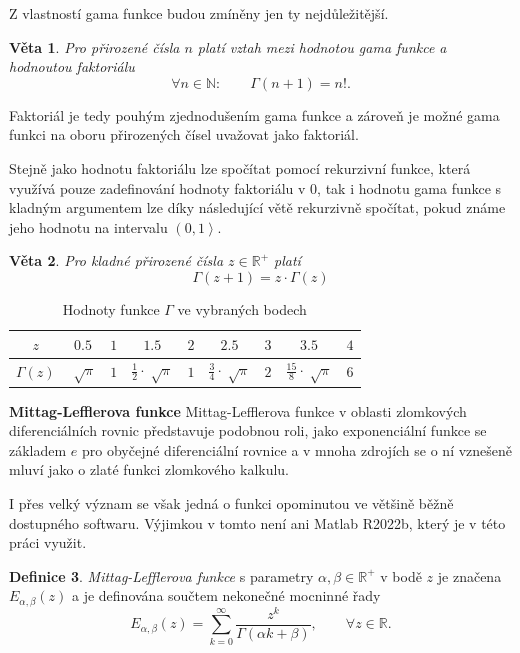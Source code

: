 \documentclass[a4paper,12pt,twoside]{article}
\newtheorem{veta}{Věta}[section]
\theoremstyle{definition}
\newtheorem{defin}[veta]{Definice}
\theoremstyle{remark}
\numberwithin{equation}{section}
\numberwithin{table}{section}
\numberwithin{figure}{section}
\newcommand{\R}{\mathbb{R}}
\newcommand{\N}{\mathbb{N}}
\begin{document}
Z vlastností gama funkce budou zmíněny jen ty nejdůležitější.
\begin{veta} Pro přirozené čísla $n$ platí vztah mezi hodnotou gama funkce a hodnoutou faktoriálu
	\begin{equation}
		\forall n \in \N:	\qquad  \Gamma\left( n+1\right)  = n!.
	\end{equation}
\end{veta} \label{gamma}
Faktoriál je tedy pouhým zjednodušením gama funkce a zároveň je možné gama funkci na oboru přirozených čísel uvažovat jako faktoriál.

Stejně jako hodnotu faktoriálu lze spočítat pomocí rekurzivní funkce, která využívá pouze zadefinování hodnoty faktoriálu v 0, tak i hodnotu gama funkce s kladným argumentem lze díky následující větě rekurzivně spočítat, pokud známe jeho hodnotu na intervalu $\left( 0, 1\right\rangle $.
\begin{veta}
	Pro kladné přirozené čísla $ z \in \R^{+}$ platí
	\begin{equation}\label{gamma2}
		\Gamma\left( z+1\right)  = z \cdot \Gamma\left(z\right)
	\end{equation}
\end{veta} 

\begin{table}[h!]
	\centering
	\caption{Hodnoty funkce $\Gamma$ ve vybraných bodech}\label{tab1}
	\begin{tabular}{|c|cccccccc|}
		\toprule
		$z$ 					& $0.5$				&	$1$ &	$1.5$ 							&	$2$ & $2.5$ 							& $3$ & $3.5$ 							&	$4$ 		\\\midrule
		$\Gamma \left(z\right)$ & $\sqrt[]{\pi}$ 	& 	$1$ &	${\frac{1}{2}}\cdot\sqrt[]{\pi}$&	$1$ & ${\frac{3}{4}}\cdot\sqrt[]{\pi}$ 	& $2$ &	${\frac{15}{8}}\cdot\sqrt[]{\pi}$ & $6$ \\
		\bottomrule
	\end{tabular}
\end{table}


\textbf{Mittag-Lefflerova funkce}
Mittag-Lefflerova funkce v oblasti zlomkových diferenciálních rovnic představuje podobnou roli, jako exponenciální funkce se základem $e$ pro obyčejné diferenciální rovnice a v mnoha zdrojích se o ní vznešeně mluví jako o zlaté funkci zlomkového kalkulu.

I přes velký význam se však jedná o funkci opominutou ve většině běžně dostupného softwaru. Výjimkou v tomto není ani Matlab R2022b, který je v této práci využit.

\begin{defin}\label{DefinMLfce} %
	\emph{Mittag-Lefflerova funkce} s parametry $\alpha, \beta \in \R^{+}$ v bodě $z$ je značena $E_{\alpha, \beta} \left( z\right)$ a je definována součtem nekonečné mocninné řady
	$$
	E_{\alpha, \beta} \left( z\right) =  \sum_{k=0}^{\infty} \frac{z^{k}}{\Gamma\left( \alpha k +\beta \right)}, \qquad \forall z \in  \R.  	
	$$
\end{defin}
\end{document}
